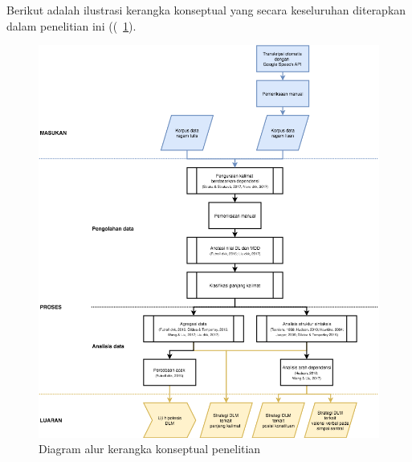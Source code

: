 Berikut adalah ilustrasi kerangka konseptual yang secara keseluruhan diterapkan dalam penelitian ini ((\pic~\ref{fig:kerangka-konseptual}). 
\begin{figure}
	\centering \includegraphics[width=1
	\textwidth] {pics/kerangka-konseptual.png} \caption{Diagram alur kerangka konseptual penelitian} 
\label{fig:kerangka-konseptual} \end{figure}


